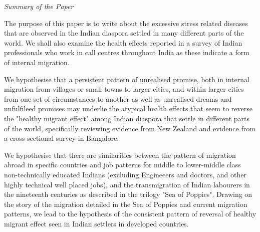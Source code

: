 \textit{Summary of the Paper} 

The purpose of this paper is to write about the excessive stress related diseases that are observed in the Indian diaspora settled in many different parts of the world. We shall also examine the health effects reported in a survey of Indian professionals who work in call centres throughout India as these indicate a form of internal migration. 

We hypothesise that a persistent pattern of unrealised promise, both in internal migration from villages or small towns to larger cities, and within larger cities from one set of circumstances to another as well as unrealised dreams and unfulfileed promises may underlie the atypical health effects that seem to reverse the "healthy migrant effect" among Indian diaspora that settle in different parts of the world, specifically reviewing evidence from New Zealand and evidence from a cross sectional survey in Bangalore. 

We hypothesise that there are similarities between the pattern of migration abroad in specific countries and job patterns for middle to lower-middle class non-technically educated Indians (excluding Engineeers and doctors, and other highly technical well placed jobs), and the transmigration of Indian labourers in the nineteenth centuries as described in the trilogy "Sea of Poppies". Drawing on the story of the migration detailed in the Sea of Poppies and current migration patterns, we lead to the hypothesis of the consistent pattern of reversal of healthy migrant effect seen in Indian settlers in developed countries. 
